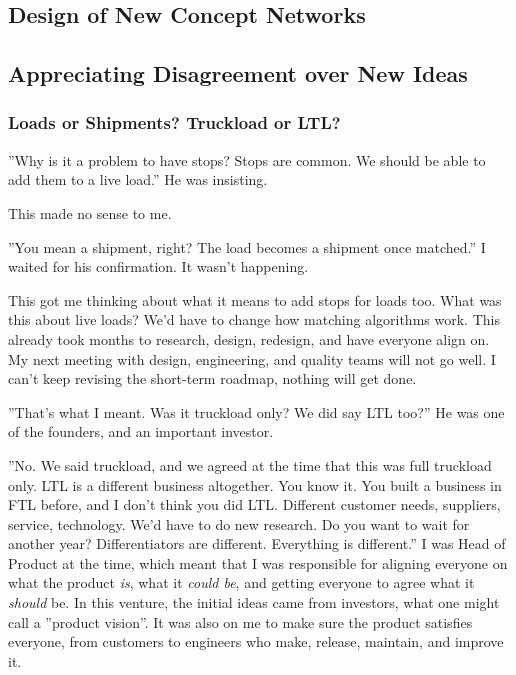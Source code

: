 \documentclass[graybox,envcountchap,sectrefs]{svmono}
\newcommand{\ncnf}{New Concept Network}
\begin{document}
\begin{partbacktext}
\part{Design of \ncnf s}
\label{pt-1}
\end{partbacktext}

\chapter{Appreciating Disagreement over New Ideas}\label{c:introduction}


\section{Loads or Shipments? Truckload or LTL?}
''Why is it a problem to have stops? Stops are common. We should be able to add them to a live load.'' He was insisting.
 
This made no sense to me.
 
''You mean a shipment, right? The load becomes a shipment once matched.'' I waited for his confirmation. It wasn't happening.

This got me thinking about what it means to add stops for loads too. What was this about live loads? We'd have to change how matching algorithms work. This already took months to research, design, redesign, and have everyone align on. My next meeting with design, engineering, and quality teams will not go well. I can't keep revising the short-term roadmap, nothing will get done.
 
''That's what I meant. Was it truckload only? We did say LTL too?'' He was one of the founders, and an important investor.

''No. We said truckload, and we agreed at the time that this was full truckload only. LTL is a different business altogether. You know it. You built a business in FTL before, and I don't think you did LTL. Different customer needs, suppliers, service, technology. We'd have to do new research. Do you want to wait for another year? Differentiators are different. Everything is different.'' I was Head of Product at the time, which meant that I was responsible for aligning everyone on what the product \textit{is}, what it \textit{could be}, and getting everyone to agree what it \textit{should} be. In this venture, the initial ideas came from investors, what one might call a ''product vision''. It was also on me to make sure the product satisfies everyone, from customers to engineers who make, release, maintain, and improve it. 
\end{document}
